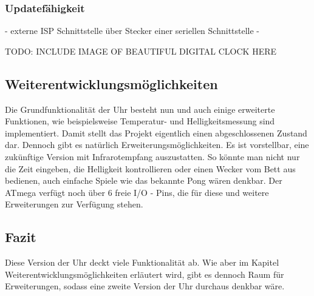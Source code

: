\subsubsection{Updatefähigkeit}
- externe ISP Schnittstelle über Stecker einer seriellen Schnittstelle 
- 

TODO: INCLUDE IMAGE OF BEAUTIFUL DIGITAL CLOCK HERE


\subsection{Weiterentwicklungsmöglichkeiten}
Die Grundfunktionalität der Uhr besteht nun und auch einige erweiterte
Funktionen, wie beispielsweise Temperatur- und Helligkeitsmessung sind
implementiert. Damit stellt das Projekt eigentlich einen abgeschlossenen Zustand
dar. Dennoch gibt es natürlich Erweiterungsmöglichkeiten. Es ist vorstellbar,
eine zukünftige Version mit Infrarotempfang auszustatten. So könnte man nicht
nur die Zeit eingeben, die Helligkeit kontrollieren oder einen Wecker vom Bett
aus bedienen, auch einfache Spiele wie das bekannte Pong wären denkbar. %
Der ATmega
verfügt noch über 6 freie I/O - Pins, die für diese und weitere Erweiterungen
zur Verfügung stehen.

%
\subsection{Fazit}
Diese Version der Uhr deckt viele Funktionalität ab. Wie aber im Kapitel Weiterentwicklungsmöglichkeiten erläutert wird, gibt es dennoch Raum für Erweiterungen, sodass eine zweite Version der Uhr durchaus denkbar wäre.
